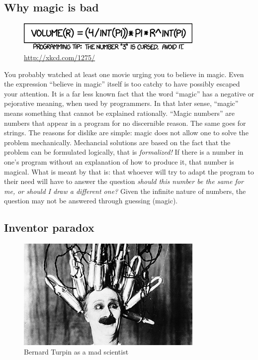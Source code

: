 \documentclass[11pt]{article}
\begin{document}
\newpage
\subsection{Why magic is bad}
\label{sec-1-3}

\begin{figure}[h!]
  \centering
  \includegraphics[width=0.8\textwidth]{./int_pi.png}
  \caption[Cursed number 3]{
    \ssmall \url{http://xkcd.com/1275/}}
\end{figure}

You probably watched at least one movie urging you to believe in magic.  Even
the expression ``believe in magic'' itself is too catchy to have possibly
escaped your attention.  It is a far less known fact that the word ``magic''
has a negative or pejorative meaning, when used by programmers.  In that
later sense, ``magic'' means something that cannot be explained rationally.
``Magic numbers'' are numbers that appear in a program for no discernible
reason.  The same goes for strings.  The reasons for dislike are simple:
magic does not allow one to solve the problem mechanically.  Mechancial
solutions are based on the fact that the problem can be formulated logically,
that is \emph{formalized!} If there is a number in one's program without an
explanation of how to produce it, that number is magical.  What is meant by
that is: that whoever will try to adapt the program to their need will have
to answer the question \emph{should this number be the same for me, or should I
draw a different one?} Given the infinite nature of numbers, the question may
not be answered through guessing (magic).
\subsection{Inventor paradox}
\label{sec-1-4}

\begin{figure}[h!]
  \centering
  \includegraphics[width=0.8\textwidth]{./electorshocked-inventor.jpg}
  \caption[Inventor-chopper]{
    \ssmall Bernard Turpin as a mad scientist}
\end{figure}
\end{document}
